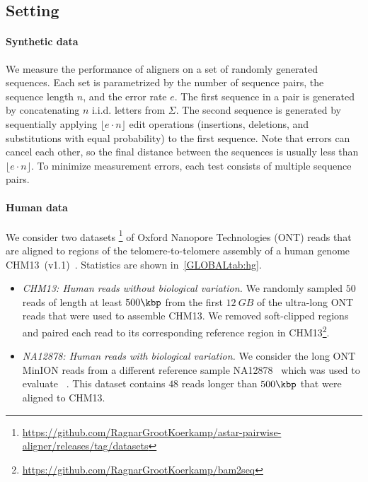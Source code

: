 \subsection{Setting} \label{GLOBALsec:evals-setup}

\paragraph{Synthetic data}
We measure the performance of aligners on a set of randomly generated sequences.
Each set is parametrized by the number of sequence pairs, the sequence length
$n$, and the error rate $e$. The first sequence in a pair is generated by
concatenating $n$ i.i.d. letters from $\Sigma$. The second sequence is generated
by sequentially applying $\lfloor e{\cdot} n\rfloor$ edit operations
(insertions, deletions, and substitutions with equal probability) to the first
sequence. Note that errors can cancel each other, so the final distance between
the sequences is usually less than $\lfloor e{\cdot} n \rfloor$. To minimize
measurement errors, each test consists of multiple sequence pairs.

\paragraph{Human data}
We consider two datasets%
\footnote{\url{https://github.com/RagnarGrootKoerkamp/astar-pairwise-aligner/releases/tag/datasets}}
of Oxford Nanopore Technologies (ONT) reads that are aligned to regions of the
telomere-to-telomere assembly of a human genome
CHM13~(v1.1)~\citep{nurk2022complete}. Statistics are shown in~\cref{GLOBALtab:hg}.

\begin{itemize}
  \item \emph{CHM13: Human reads without biological variation.} We randomly
        sampled $50$ reads of length at least $500\kbp$ from the first
        $\qty{12}{GB}$ of the ultra-long ONT reads that were used to assemble
        CHM13. We removed soft-clipped regions and paired each read to its
        corresponding reference region in CHM13\footnote{\url{https://github.com/RagnarGrootKoerkamp/bam2seq}}.
  \item \emph{NA12878: Human reads with biological variation.} We consider the
        long ONT MinION reads from a different reference sample
        NA12878~\citep{bowden2019sequencing} which was used to evaluate
        \wfa~\citep{marco2022optimal}. This dataset contains $48$ reads longer than
        $500\kbp$ that were aligned to CHM13.
\end{itemize}

